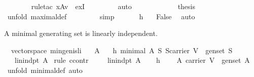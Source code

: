 \begin{isabellebody}
\ \ \ \ \ \ \isamarkupfalse%
\ {\isacharparenleft}rule{\isacharunderscore}tac\ x{\isacharequal}{\isachardoublequoteopen}A{\isasymunion}{\isacharbraceleft}v{\isacharbraceright}{\isachardoublequoteclose}\ \ exI{\isacharparenright}\ \isanewline
\ \ \ \ \ \ \isamarkupfalse%
\ auto\ \ \ \ \isanewline
\ \ \ \ \isamarkupfalse%
\ {}\ \isamarkupfalse%
\ {\isacharquery}thesis\ \isanewline
\ \ \ \ \ \ \isamarkupfalse%
\ {\isacharparenleft}unfold\ maximal{\isacharunderscore}def{\isacharparenright}\ \isanewline
\ \ \ \ \ \ \isamarkupfalse%
\ simp\isanewline
\ \ \isamarkupfalse%
\isanewline
\ \ \isamarkupfalse%
\ h{}\ {}\ \isamarkupfalse%
\ False\ \isamarkupfalse%
\ auto\isanewline
{}\isamarkupfalse%
%
\endisatagproof
{\isafoldproof}%
%
\isadelimproof
%
\endisadelimproof
%
\begin{isamarkuptext}%
A minimal generating set is linearly independent.%
\end{isamarkuptext}%
\isamarkuptrue%
\isamarkupfalse%
\ {\isacharparenleft}\ vectorspace{\isacharparenright}\ min{\isacharunderscore}gen{\isacharunderscore}is{\isacharunderscore}li{\isacharcolon}\isanewline
\ \ \ A\isanewline
\ \ \ h{}{\isacharcolon}\ {\isachardoublequoteopen}minimal\ A\ {\isacharparenleft}{\isasymlambda}S{\isachardot}\ S{\isasymsubseteq}carrier\ V\ {\isasymand}\ gen{\isacharunderscore}set\ S{\isacharparenright}{\isachardoublequoteclose}\isanewline
\ \ \ {\isachardoublequoteopen}lin{\isacharunderscore}indpt\ A{\isachardoublequoteclose}\isanewline
%
\isadelimproof
%
\endisadelimproof
%
\isatagproof
{}\isamarkupfalse%
\ {\isacharparenleft}rule\ ccontr{\isacharparenright}\isanewline
\ \ \isamarkupfalse%
\ {}{\isacharcolon}\ {\isachardoublequoteopen}{\isasymnot}lin{\isacharunderscore}indpt\ A{\isachardoublequoteclose}\isanewline
\ \ \isamarkupfalse%
\ h{}\ \isamarkupfalse%
\ {}{\isacharcolon}\ {\isachardoublequoteopen}\ A{\isasymsubseteq}\ carrier\ V\ {\isasymand}\ gen{\isacharunderscore}set\ A{\isachardoublequoteclose}\ \isamarkupfalse%
\ {\isacharparenleft}unfold\ minimal{\isacharunderscore}def{\isacharcomma}\ auto{\isacharparenright}\isanewline
\ \ \isamarkupfalse%
\ {}\ \isamarkupfalse%

\end{isabellebody}
